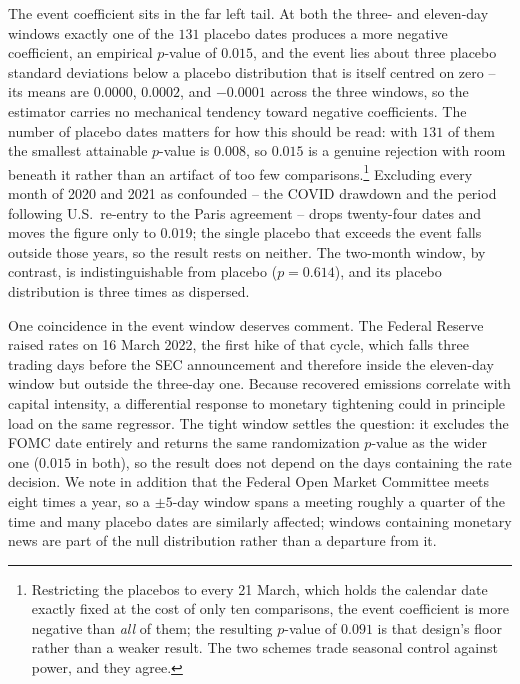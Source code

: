\documentclass[a4paper,12pt]{article}
\begin{document}
The event coefficient sits in the far left tail. At both the three- and eleven-day windows exactly one of the $131$ placebo dates produces a more negative coefficient, an empirical $p$-value of $0.015$, and the event lies about three placebo standard deviations below a placebo distribution that is itself centred on zero -- its means are $0.0000$, $0.0002$, and $-0.0001$ across the three windows, so the estimator carries no mechanical tendency toward negative coefficients. The number of placebo dates matters for how this should be read: with $131$ of them the smallest attainable $p$-value is $0.008$, so $0.015$ is a genuine rejection with room beneath it rather than an artifact of too few comparisons.\footnote{Restricting the placebos to every 21 March, which holds the calendar date exactly fixed at the cost of only ten comparisons, the event coefficient is more negative than \emph{all} of them; the resulting $p$-value of $0.091$ is that design's floor rather than a weaker result. The two schemes trade seasonal control against power, and they agree.} Excluding every month of 2020 and 2021 as confounded -- the COVID drawdown and the period following U.S.\ re-entry to the Paris agreement -- drops twenty-four dates and moves the figure only to $0.019$; the single placebo that exceeds the event falls outside those years, so the result rests on neither. The two-month window, by contrast, is indistinguishable from placebo ($p = 0.614$), and its placebo distribution is three times as dispersed.

One coincidence in the event window deserves comment. The Federal Reserve raised rates on 16 March 2022, the first hike of that cycle, which falls three trading days before the SEC announcement and therefore inside the eleven-day window but outside the three-day one. Because recovered emissions correlate with capital intensity, a differential response to monetary tightening could in principle load on the same regressor. The tight window settles the question: it excludes the FOMC date entirely and returns the same randomization $p$-value as the wider one ($0.015$ in both), so the result does not depend on the days containing the rate decision. We note in addition that the Federal Open Market Committee meets eight times a year, so a $\pm 5$-day window spans a meeting roughly a quarter of the time and many placebo dates are similarly affected; windows containing monetary news are part of the null distribution rather than a departure from it.
\end{document}
